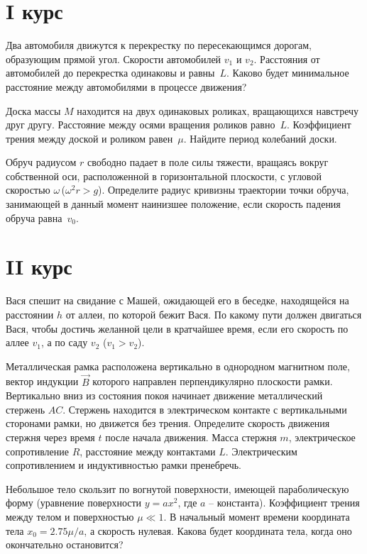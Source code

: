 \section{I курс}

\AddProb Два автомобиля движутся к перекрестку по пересекающимся дорогам, образующим 
прямой угол. Скорости автомобилей $v_1$ и $v_2$. Расстояния от автомобилей до перекрестка одинаковы и равны~$L$. 
Каково будет минимальное расстояние между автомобилями в процессе движения?

\AddProb Доска массы $M$ находится на двух одинаковых роликах, вращающихся навстречу друг другу. Расстояние между осями вращения роликов равно~$L$. 
Коэффициент трения между доской и роликом равен~$\mu$. Найдите период колебаний доски.

\AddProb Обруч радиусом $r$ свободно падает в поле силы тяжести, вращаясь вокруг собственной оси, расположенной в горизонтальной плоскости, 
с угловой скоростью $\omega$\,($\omega^2r > g$). Определите радиус кривизны траектории точки обруча, занимающей в данный момент наинизшее положение, 
если скорость падения обруча равна~$v_0$.


\section{II курс}

\AddProb Вася спешит на свидание с Машей, ожидающей его в беседке, находящейся на расстоянии $h$ от аллеи, по которой бежит Вася. 
По какому пути должен двигаться Вася, чтобы достичь желанной цели в кратчайшее время, если его скорость по аллее $v_1$, а по саду $v_2$ ($v_1>v_2$).

\AddProb Металлическая рамка расположена вертикально в однородном магнитном поле, вектор индукции $\vec B$ которого направлен перпендикулярно плоскости рамки. 
Вертикально вниз из состояния покоя начинает движение металлический стержень $AC$. Стержень находится в электрическом контакте с 
вертикальными сторонами рамки, но движется без трения. Определите скорость движения стержня через время $t$ после начала движения. 
Масса стержня $m$, электрическое сопротивление $R$, расстояние между контактами $L$. Электрическим сопротивлением и индуктивностью рамки пренебречь.

\AddProb Небольшое тело скользит по вогнутой поверхности, имеющей параболическую форму (уравнение поверхности $y = ax^2$, где $a$ -- константа). 
Коэффициент трения между телом и поверхностью $\mu\ll 1$. В начальный момент времени координата тела $x_0 = 2.75\mu/a$, а скорость нулевая. 
Какова будет координата тела, когда оно окончательно остановится?


